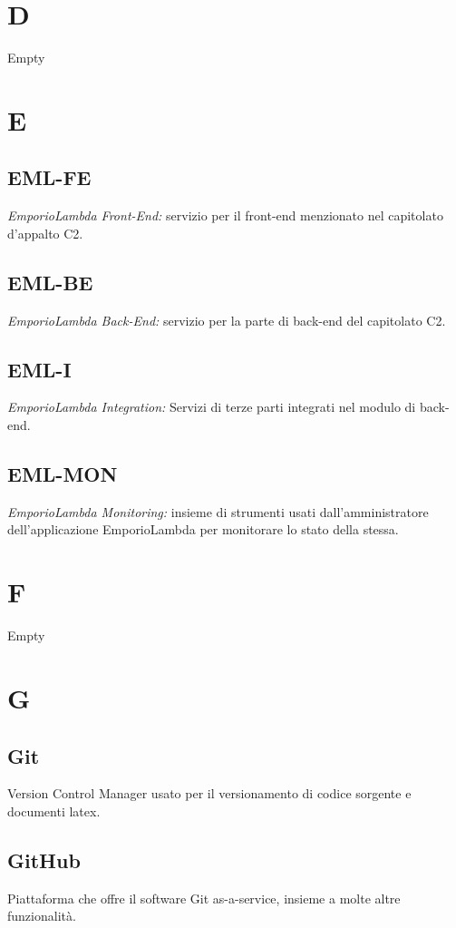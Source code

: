 \section*{D}
Empty

\section*{E}
\subsection*{EML-FE}
\textit{EmporioLambda Front-End:} servizio per il front-end menzionato nel capitolato d'appalto C2.

\subsection*{EML-BE}
\textit{EmporioLambda Back-End:} servizio per la parte di back-end del capitolato C2.

\subsection*{EML-I}
\textit{EmporioLambda Integration:} Servizi di terze parti integrati nel modulo di back-end.

\subsection*{EML-MON}
\textit{EmporioLambda Monitoring:} insieme di strumenti usati dall'amministratore dell'applicazione EmporioLambda
per monitorare lo stato della stessa.

\section*{F}
Empty

\section*{G}
\subsection*{Git}
Version Control Manager usato per il versionamento di codice sorgente e documenti latex.

\subsection*{GitHub}
Piattaforma che offre il software Git as-a-service, insieme a molte altre funzionalità.

